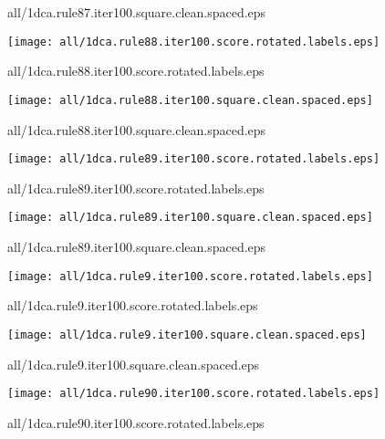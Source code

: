 \documentclass{article}
\begin{document}
{\footnotesize all/1dca.rule87.iter100.square.clean.spaced.eps}
\begin{center}
\begin{minipage}{\textwidth}
\texttt{[image: all/1dca.rule88.iter100.score.rotated.labels.eps]}
\end{minipage}
\end{center}
{\footnotesize all/1dca.rule88.iter100.score.rotated.labels.eps}
\begin{center}
\begin{minipage}{\textwidth}
\texttt{[image: all/1dca.rule88.iter100.square.clean.spaced.eps]}
\end{minipage}
\end{center}
{\footnotesize all/1dca.rule88.iter100.square.clean.spaced.eps}
\begin{center}
\begin{minipage}{\textwidth}
\texttt{[image: all/1dca.rule89.iter100.score.rotated.labels.eps]}
\end{minipage}
\end{center}
{\footnotesize all/1dca.rule89.iter100.score.rotated.labels.eps}
\begin{center}
\begin{minipage}{\textwidth}
\texttt{[image: all/1dca.rule89.iter100.square.clean.spaced.eps]}
\end{minipage}
\end{center}
{\footnotesize all/1dca.rule89.iter100.square.clean.spaced.eps}
\begin{center}
\begin{minipage}{\textwidth}
\texttt{[image: all/1dca.rule9.iter100.score.rotated.labels.eps]}
\end{minipage}
\end{center}
{\footnotesize all/1dca.rule9.iter100.score.rotated.labels.eps}
\begin{center}
\begin{minipage}{\textwidth}
\texttt{[image: all/1dca.rule9.iter100.square.clean.spaced.eps]}
\end{minipage}
\end{center}
{\footnotesize all/1dca.rule9.iter100.square.clean.spaced.eps}
\begin{center}
\begin{minipage}{\textwidth}
\texttt{[image: all/1dca.rule90.iter100.score.rotated.labels.eps]}
\end{minipage}
\end{center}
{\footnotesize all/1dca.rule90.iter100.score.rotated.labels.eps}
\end{document}
